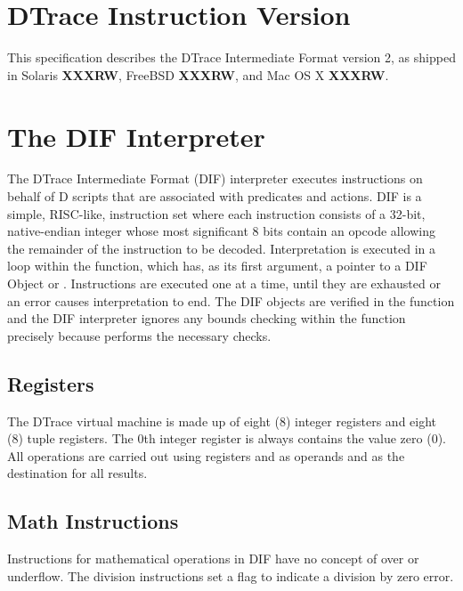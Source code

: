 
\section{DTrace Instruction Version}

This specification describes the DTrace Intermediate Format version 2, as
shipped in Solaris \textbf{XXXRW}, FreeBSD \textbf{XXXRW}, and Mac OS X
\textbf{XXXRW}.

\section{The DIF Interpreter}

The DTrace Intermediate Format (DIF) interpreter executes instructions
on behalf of D scripts that are associated with predicates and
actions.  DIF is a simple, RISC-like, instruction set where each
instruction consists of a 32-bit, native-endian integer whose most
significant 8 bits contain an opcode allowing the remainder of the
instruction to be decoded.  Interpretation is executed in a loop
within the  function, which has, as
its first argument, a pointer to a DIF Object or
.  Instructions are executed one at a time,
until they are exhausted or an error causes interpretation to end. The DIF
objects are verified in the  function and
the DIF interpreter ignores any bounds checking within the
 function precisely because
 performs the necessary checks.

\subsection{Registers}
\label{sec:dif-registers}

The DTrace virtual machine is made up of eight (8) integer registers
and eight (8) tuple registers.  The 0th integer register is always contains
the value zero (0).  All operations are carried out using registers
 and  as operands and  as
the destination for all results.

\subsection{Math Instructions}
\label{sec:dif-math}

Instructions for mathematical operations in DIF have no concept of
over or underflow.  The division instructions set a flag to indicate a
division by zero error.


